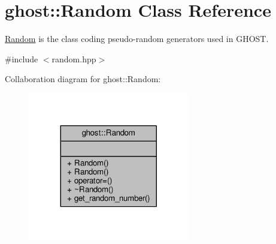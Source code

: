 \hypertarget{classghost_1_1Random}{}\section{ghost\+:\+:Random Class Reference}
\label{classghost_1_1Random}


\hyperlink{classghost_1_1Random}{Random} is the class coding pseudo-\/random generators used in G\+H\+O\+ST.  




{\ttfamily \#include $<$random.\+hpp$>$}



Collaboration diagram for ghost\+:\+:Random\+:\nopagebreak
\begin{figure}[H]
\begin{center}
\leavevmode
\includegraphics[width=200pt]{classghost_1_1Random__coll__graph}
\end{center}
\end{figure}
